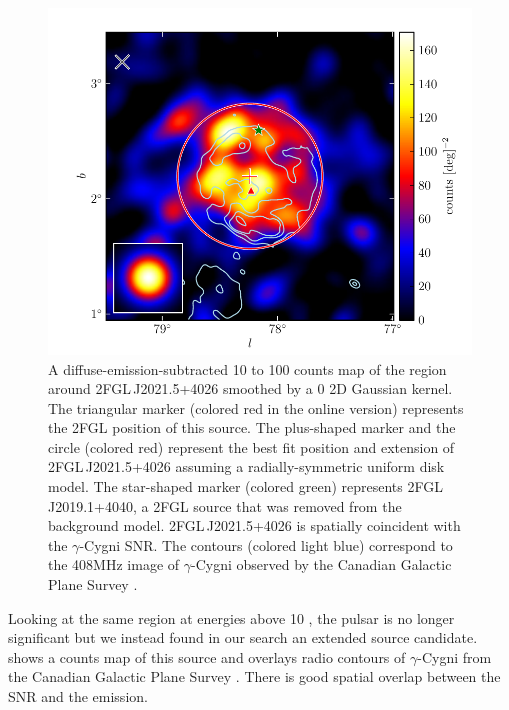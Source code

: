 \begin{figure}[htbp]
  \includegraphics{chapters/extended_search/figures/source_plots/source_Gamma_Cygni_color.pdf}
  \caption{A diffuse-emission-subtracted 10 \gev to 100 \gev counts
  map of the region around 2FGL\,J2021.5+4026 smoothed by a 0
  2D Gaussian kernel. The triangular marker (colored red in the
  online version) represents the 2FGL position of this source.
  The plus-shaped marker and the circle (colored red) represent the
  best fit position and extension of 2FGL\,J2021.5+4026 assuming
  a radially-symmetric uniform disk model.  The star-shaped marker
  (colored green) represents 2FGL\,J2019.1+4040, a 2FGL source that was
  removed from the background model.  2FGL\,J2021.5+4026 is spatially
  coincident with the $\gamma$-Cygni SNR.  The contours (colored light
  blue) correspond to the 408MHz image of $\gamma$-Cygni observed by the
  Canadian Galactic Plane Survey \citep{taylor_2003a_canadian-galactic}.}
\end{figure}

Looking at the same region at energies above 10 \gev, the pulsar is
no longer significant but we instead found in our search an extended
source candidate.   shows a counts map of this
source and overlays radio contours of $\gamma$-Cygni from the Canadian
Galactic Plane Survey \citep{taylor_2003a_canadian-galactic}.  There is
good spatial overlap between the SNR and the \gev emission.

